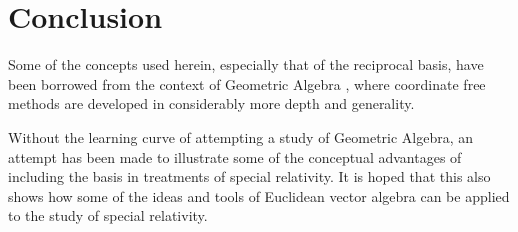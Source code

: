 \section{Conclusion}

Some of the concepts used herein, especially that of the reciprocal basis, have been borrowed from the context of Geometric Algebra
\citep{doran2003gap}
, where coordinate free methods are developed in considerably more depth and generality.

Without the learning curve of attempting a study of Geometric Algebra, an attempt has been made to illustrate some of the conceptual advantages of including the basis in treatments of special relativity.  It is hoped that this also shows how some of the ideas and tools of Euclidean vector algebra can be applied to the study of special relativity.

\EndArticle
